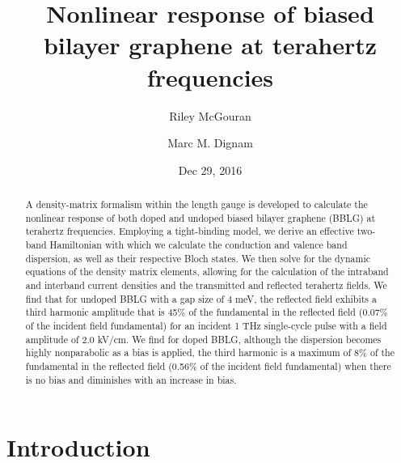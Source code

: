\documentclass[twocolumn,secnumarabic,amssymb, nobibnotes, aps, prd, superscriptaddress]{revtex4-1}
\begin{document}
\title{Nonlinear response of biased bilayer graphene at terahertz frequencies}%

\author{Riley McGouran}%
\author{Marc M. Dignam}%
\date{Dec 29, 2016}%

\begin{abstract}
A density-matrix formalism within the length gauge is developed to calculate the nonlinear response of both doped and undoped biased bilayer graphene (BBLG) at terahertz frequencies. Employing a tight-binding model, we derive an effective two-band Hamiltonian with which we calculate the conduction and valence band dispersion, as well as their respective Bloch states. We then solve for the dynamic equations of the density matrix elements, allowing for the calculation of the intraband and interband current densities and the transmitted and reflected terahertz fields. We find that for undoped BBLG with a gap size of 4 meV, the reflected field exhibits a third harmonic amplitude that is 45\% of the fundamental in the reflected field (0.07\% of the incident field fundamental) for an incident 1 THz single-cycle pulse with a field amplitude of 2.0  kV/cm. We find for doped BBLG, although the dispersion becomes highly nonparabolic as a bias is applied, the third harmonic is a maximum of 8\% of the fundamental in the reflected field (0.56\% of the incident field fundamental) when there is no bias and diminishes with an increase in bias.
\end{abstract}


\maketitle

\section{Introduction}
\end{document}
